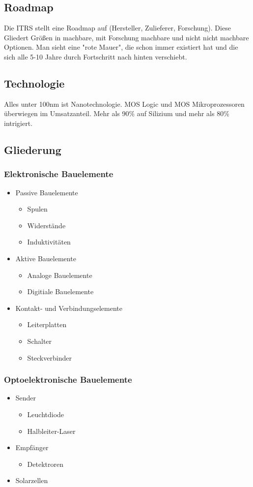 \subsection{Roadmap}
Die ITRS stellt eine Roadmap auf (Hersteller, Zulieferer, Forschung). Diese Gliedert Größen in machbare, mit Forschung machbare und nicht nicht machbare Optionen. Man sieht eine "rote Mauer", die schon immer existiert hat und die sich alle 5-10 Jahre durch Fortschritt nach hinten verschiebt.

\subsection{Technologie}
Alles unter 100nm ist Nanotechnologie. MOS Logic und MOS Mikroprozessoren überwiegen im Umsatzanteil.
Mehr als 90\% auf Silizium und mehr als 80\% intrigiert.

\subsection{Gliederung}

\subsubsection{Elektronische Bauelemente}
\begin{itemize}
	\item Passive Bauelemente
	\begin{itemize}
		\item Spulen
		\item Widerstände
		\item Induktivitäten
	\end{itemize}
	\item Aktive Bauelemente
	\begin{itemize}
		\item Analoge Bauelemente
		\item Digitiale Bauelemente
	\end{itemize}
	\item Kontakt- und Verbindungselemente
	\begin{itemize}
		\item Leiterplatten
		\item Schalter
		\item Steckverbinder
	\end{itemize}
\end{itemize}
\subsubsection{Optoelektronische Bauelemente}
\begin{itemize}
	\item Sender
	\begin{itemize}
		\item Leuchtdiode
		\item Halbleiter-Laser
	\end{itemize}
	\item Empfänger
	\begin{itemize}
		\item Detektroren
	\end{itemize}
	\item Solarzellen
\end{itemize}



